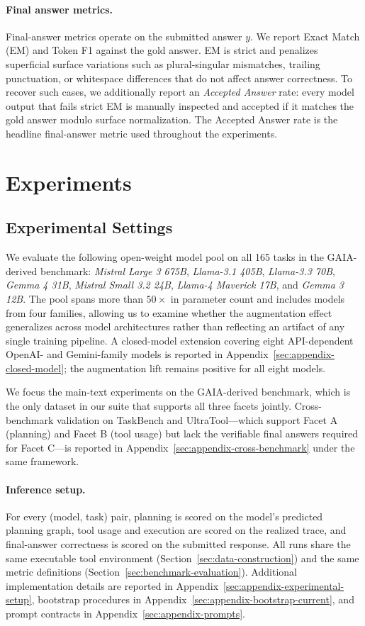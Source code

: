 \documentclass{article}
\providecommand{\model}[1]{\emph{#1}}
\begin{document}
\paragraph{Final answer metrics.}
Final-answer metrics operate on the submitted answer $y$. We report Exact Match (EM) and Token F1 against the gold answer. EM is strict and penalizes superficial surface variations such as plural-singular mismatches, trailing punctuation, or whitespace differences that do not affect answer correctness. To recover such cases, we additionally report an \emph{Accepted Answer} rate: every model output that fails strict EM is manually inspected and accepted if it matches the gold answer modulo surface normalization. The Accepted Answer rate is the headline final-answer metric used throughout the experiments.


\section{Experiments}
\label{sec:experiments}
\subsection{Experimental Settings}

We evaluate the following open-weight model pool on all 165 tasks in the GAIA-derived benchmark: \model{Mistral Large 3 675B}, \model{Llama-3.1 405B}, \model{Llama-3.3 70B}, \model{Gemma 4 31B}, \model{Mistral Small 3.2 24B}, \model{Llama-4 Maverick 17B}, and \model{Gemma 3 12B}.
The pool spans more than $50\times$ in parameter count and includes models from four families, allowing us to examine whether the augmentation effect generalizes across model architectures rather than reflecting an artifact of any single training pipeline.
A closed-model extension covering eight API-dependent OpenAI- and Gemini-family models is reported in Appendix~\ref{sec:appendix-closed-model}; the augmentation lift remains positive for all eight models.


We focus the main-text experiments on the GAIA-derived benchmark, which is the only dataset in our suite that supports all three facets jointly. Cross-benchmark validation on TaskBench and UltraTool---which support Facet A (planning) and Facet B (tool usage) but lack the verifiable final answers required for Facet C---is reported in Appendix~\ref{sec:appendix-cross-benchmark} under the same framework.

\paragraph{Inference setup.}
For every (model, task) pair, planning is scored on the model's predicted planning graph, tool usage and execution are scored on the realized trace, and final-answer correctness is scored on the submitted response. 
All runs share the same executable tool environment (Section~\ref{sec:data-construction}) and the same metric definitions (Section~\ref{sec:benchmark-evaluation}).
Additional implementation details are reported in Appendix~\ref{sec:appendix-experimental-setup}, bootstrap procedures in Appendix~\ref{sec:appendix-bootstrap-current}, and prompt contracts in Appendix~\ref{sec:appendix-prompts}.
\end{document}
